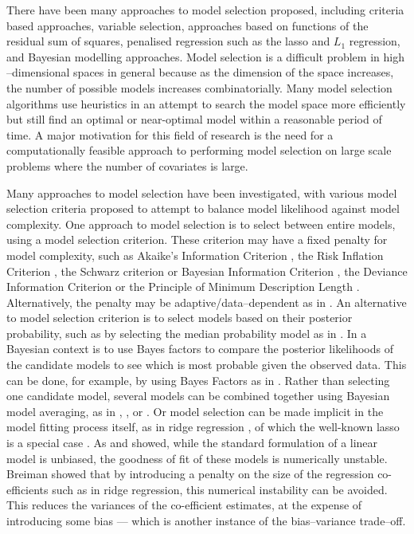 There have been many approaches to model selection proposed, including criteria based approaches, variable
selection, approaches based on functions of the residual sum of squares, penalised regression such as the
lasso and $L_1$ regression, and Bayesian modelling approaches. Model selection is a difficult problem in high
--dimensional spaces in general because as the dimension of the space increases, the number of possible models
increases combinatorially. Many model selection algorithms use heuristics in an attempt to search the model
space more efficiently but still find an optimal or near-optimal model within a reasonable period of time. A
major motivation for this field of research is the need for a computationally feasible approach to performing
model selection on large scale problems where the number of covariates is large.

Many approaches to model selection have been investigated, with various model selection criteria
proposed to attempt to balance model likelihood against model complexity. One approach to model selection is
to select between entire models, using a model selection criterion. These criterion may have a fixed penalty
for model complexity, such as Akaike's Information Criterion \citep{Akaike1974}, the Risk Inflation Criterion
\citep{Foster1994}, the Schwarz criterion or Bayesian Information Criterion \citep{Schwarz1978}, the Deviance
Information Criterion \citep{Spiegelhalter2016} or the Principle of Minimum Description Length
\citep{Hansen2001}. Alternatively, the penalty may be adaptive/data--dependent as in \citep{George2000}. An
alternative to model selection criterion is to select models based on their posterior probability, such as by
selecting the median probability model as in \citep{Barbieri2004}. In a Bayesian context is to use Bayes
factors to compare the posterior likelihoods of the candidate models to see which is most probable given the
observed data. This can be done, for example, by using Bayes Factors as in \citep{Kass1993}. Rather than
selecting one candidate model, several models can be combined together using Bayesian model  averaging, as in
\citep{Hoeting1999}, \citep{Raftery1997}, \citep{Fernandez2001} or \citep{Papaspiliopoulos2016}. Or model
selection can be made implicit in the model fitting process itself, as in ridge regression \citep{Casella1980},
of which the well-known lasso is a special case \citep{Tibshirani1996}. As \citep{Breiman1996} and
\citep{Efron2013} showed, while  the standard formulation of a linear model is unbiased, the goodness of fit of
these models is numerically  unstable. Breiman showed that by introducing a penalty on the size of the
regression co- efficients such as  in ridge regression, this numerical instability can be avoided. This
reduces the variances of the co-efficient estimates, at the expense of introducing some bias --- 
which is another instance of the bias--variance trade--off.


